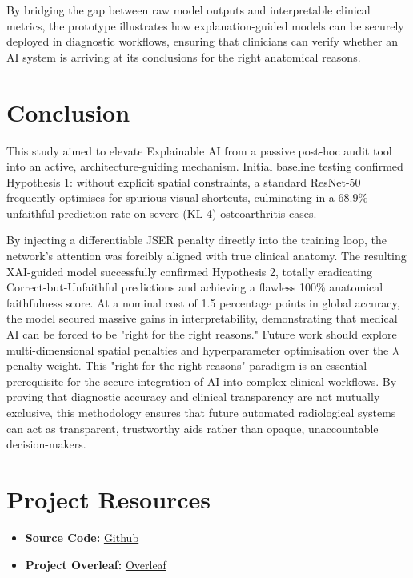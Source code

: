 \documentclass[conference]{IEEEtran}
\begin{document}
By bridging the gap between raw model outputs and interpretable clinical metrics, the prototype illustrates how explanation-guided models can be securely deployed in diagnostic workflows, ensuring that clinicians can verify whether an AI system is arriving at its conclusions for the right anatomical reasons.

\section{Conclusion}
\label{sec:conclusion}

This study aimed to elevate Explainable AI from a passive post-hoc audit tool into an active, architecture-guiding mechanism. Initial baseline testing confirmed Hypothesis 1: without explicit spatial constraints, a standard ResNet-50 frequently optimises for spurious visual shortcuts, culminating in a 68.9\% unfaithful prediction rate on severe (KL-4) osteoarthritis cases.

By injecting a differentiable JSER penalty directly into the training loop, the network's attention was forcibly aligned with true clinical anatomy. The resulting XAI-guided model successfully confirmed Hypothesis 2, totally eradicating Correct-but-Unfaithful predictions and achieving a flawless 100\% anatomical faithfulness score. At a nominal cost of 1.5 percentage points in global accuracy, the model secured massive gains in interpretability, demonstrating that medical AI can be forced to be "right for the right reasons." Future work should explore multi-dimensional spatial penalties and hyperparameter optimisation over the $\lambda$ penalty weight. This "right for the right reasons" paradigm is an essential prerequisite for the secure integration of AI into complex clinical workflows. By proving that diagnostic accuracy and clinical transparency are not mutually exclusive, this methodology ensures that future automated radiological systems can act as transparent, trustworthy aids rather than opaque, unaccountable decision-makers.




\appendix

\section{Project Resources}
\begin{itemize}
  \item \textbf{Source Code:} \href{https://github.com/ds2026-H1H2-ID14-teamme}{Github}
  \item \textbf{Project Overleaf:} \href{https://www.overleaf.com/read/qtjbtbkwzcfz\#d6781d}{Overleaf}
\end{itemize}
\end{document}
